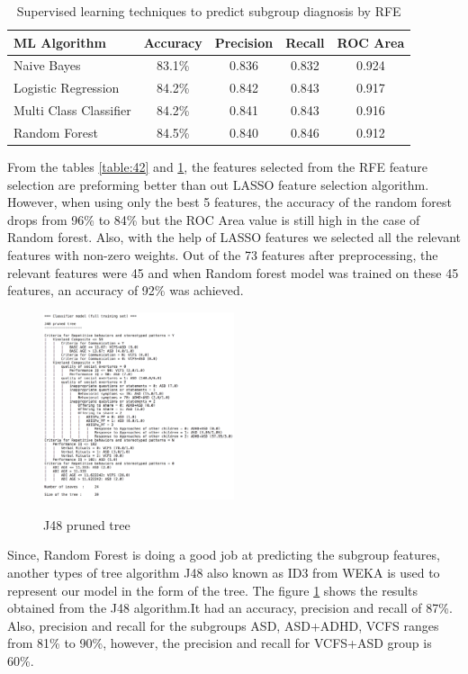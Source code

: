\begin{table}[h]
\begin{center}
\begin{tabular}{|l|c|c|c|c|}
\hline
\textbf{ML Algorithm} & \textbf{Accuracy}&	\textbf{Precision}&	\textbf{Recall}&	\textbf{ROC Area}\\
\hline \hline
Naive Bayes&	83.1\%	&0.836&	0.832&	0.924\\
\hline
Logistic Regression&84.2\%&	0.842&	0.843&	0.917\\
\hline
Multi Class Classifier&	84.2\%&	0.841&	0.843&	0.916\\
\hline
Random Forest&84.5\%&	0.840&	0.846&	0.912\\
\hline
\end{tabular}
\end{center}
\caption{Supervised learning techniques to predict subgroup diagnosis by RFE }
\label{table:43}
\end{table}
From the tables \ref{table:42} and \ref{table:43}, the features selected from the RFE feature selection are preforming better than out LASSO feature selection algorithm. However, when using only the best 5 features, the accuracy of the random forest drops from 96\% to 84\% but the ROC Area value is still high in the case of Random forest. Also, with the help of LASSO features we selected all the relevant features with non-zero weights. Out of the 73 features after preprocessing, the relevant features were 45 and when Random forest model was trained on these 45 features, an accuracy of 92\% was achieved. 
\begin{figure}
\centering
{\includegraphics[width=0.5\textwidth]{Figures/Figure_4_3.png}}
  \caption{J48 pruned tree}
  \label{fig:43}
\end{figure}

Since, Random Forest is doing a good job at predicting the subgroup features, another types of tree algorithm J48 also known as ID3 from WEKA is used to represent our model in the form of the tree. The figure \ref{fig:43} shows the results obtained from the J48 algorithm.It had an accuracy, precision and recall of 87\%. Also, precision and recall for the subgroups ASD, ASD+ADHD, VCFS ranges from 81\% to 90\%, however, the precision and recall for VCFS+ASD group is 60\%.

